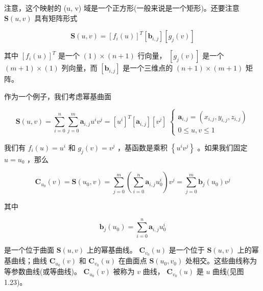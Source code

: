 \documentclass[../main.tex]{subfiles}
\begin{document}
注意，这个映射的 (u, v) 域是一个正方形(一般来说是一个矩形)。还要注意 \(\mathbf{S}\left( {u,v}\right)\) 具有矩阵形式

\[
\mathbf{S}\left( {u,v}\right)  = {\left\lbrack  {f}_{i}\left( u\right) \right\rbrack  }^{T}\left\lbrack  {\mathbf{b}}_{i,j}\right\rbrack  \left\lbrack  {{g}_{j}\left( v\right) }\right\rbrack
\]

其中 \({\left\lbrack  {f}_{i}\left( u\right) \right\rbrack  }^{T}\) 是一个 \(\left( 1\right)  \times  \left( {n + 1}\right)\) 行向量， \(\left\lbrack  {{g}_{j}\left( v\right) }\right\rbrack\) 是一个 \(\left( {m + 1}\right)  \times  \left( 1\right)\) 列向量，而 \(\left\lbrack  {\mathbf{b}}_{i,j}\right\rbrack\) 是一个三维点的 \(\left( {n + 1}\right)  \times  \left( {m + 1}\right)\) 矩阵。

作为一个例子，我们考虑幂基曲面

\[
\mathbf{S}\left( {u,v}\right)  = \mathop{\sum }\limits_{{i = 0}}^{n}\mathop{\sum }\limits_{{j = 0}}^{m}{\mathbf{a}}_{i,j}{u}^{i}{v}^{j} = {\left\lbrack  {u}^{i}\right\rbrack  }^{T}\left\lbrack  {\mathbf{a}}_{i,j}\right\rbrack  \left\lbrack  {v}^{j}\right\rbrack  \;\left\{  \begin{array}{l} {\mathbf{a}}_{i,j} = \left( {{x}_{i,j},{y}_{i,j},{z}_{i,j}}\right) \\  0 \leq  u,v \leq  1 \end{array}\right.  \tag{1.21}
\]

我们有 \({f}_{i}\left( u\right)  = {u}^{i}\) 和 \({g}_{j}\left( v\right)  = {v}^{j}\) ，基函数是乘积 \(\left\{  {{u}^{i}{v}^{j}}\right\}\) 。如果我们固定 \(u = {u}_{0}\) ，那么

\[
{\mathbf{C}}_{{u}_{0}}\left( v\right)  = \mathbf{S}\left( {{u}_{0},v}\right)  = \mathop{\sum }\limits_{{j = 0}}^{m}\left( {\mathop{\sum }\limits_{{i = 0}}^{n}{\mathbf{a}}_{i,j}{u}_{0}^{i}}\right) {v}^{j} = \mathop{\sum }\limits_{{j = 0}}^{m}{\mathbf{b}}_{j}\left( {u}_{0}\right) {v}^{j} \tag{1.22}
\]

其中

\[
{\mathbf{b}}_{j}\left( {u}_{0}\right)  = \mathop{\sum }\limits_{{i = 0}}^{n}{\mathbf{a}}_{i,j}{u}_{0}^{i}
\]

\noindent\begin{minipage}{\linewidth}
是一个位于曲面 \(\mathbf{S}\left( {u,v}\right)\) 上的幂基曲线。 \({\mathbf{C}}_{{v}_{0}}\left( u\right)\) 是一个位于 \(\mathbf{S}\left( {u,v}\right)\) 上的幂基曲线；曲线 \({\mathbf{C}}_{{u}_{0}}\left( v\right)\) 和 \({\mathbf{C}}_{{v}_{0}}\left( u\right)\) 在曲面点 \(\mathbf{S}\left( {{u}_{0},{v}_{0}}\right)\) 处相交。这些曲线称为等参数曲线(或等曲线)。 \({\mathbf{C}}_{{u}_{0}}\left( v\right)\) 被称为 \(v\) 曲线， \({\mathbf{C}}_{{v}_{0}}\left( u\right)\) 是 \(u\) 曲线(见图 1.23)。
\begin{center}
\begin{minipage}{14cm}
\centering
{}
\captionsetup{font=small,skip=6pt,justification=centering}
\end{minipage}
\end{center}
\end{minipage}
\par\medskip
\end{document}
